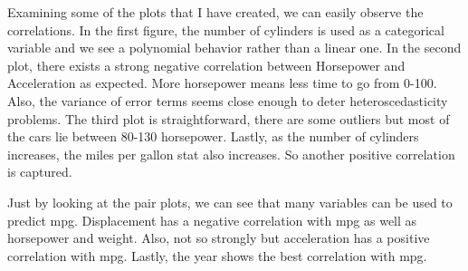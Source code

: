 \documentclass{article}
\begin{document}
Examining some of the plots that I have created, we can easily observe the correlations. In the first figure, the number of cylinders is used as a categorical variable and we see a polynomial behavior rather than a linear one. In the second plot, there exists a strong negative correlation between Horsepower and Acceleration as expected. More horsepower means less time to go from 0-100. Also, the variance of error terms seems close enough to deter heteroscedasticity problems. The third plot is straightforward, there are some outliers but most of the cars lie between 80-130 horsepower. Lastly, as the number of cylinders increases, the miles per gallon stat also increases. So another positive correlation is captured.

Just by looking at the pair plots, we can see that many variables can be used to predict mpg. Displacement has a negative correlation with mpg as well as horsepower and weight. Also, not so strongly but acceleration has a positive correlation with mpg. Lastly, the year shows the best correlation with mpg.
\end{document}
